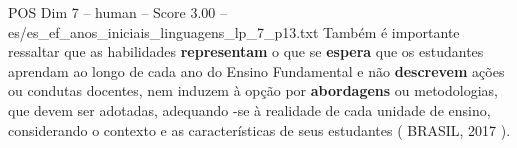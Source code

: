 \begin{textsample}{POS Dim 7 – human – Score 3.00 – es/es\_ef\_anos\_iniciais\_linguagens\_lp\_7\_p13.txt}  \label{ex:f7_pos_016}
Também é importante ressaltar que as habilidades \textbf{representam} o que se \textbf{espera} que os estudantes aprendam ao longo de cada ano do Ensino Fundamental e não \textbf{descrevem} ações ou condutas docentes, nem induzem à opção por \textbf{abordagens} ou metodologias, que devem ser adotadas, adequando -se à realidade de cada unidade de ensino, considerando o contexto e as características de seus estudantes ( BRASIL, 2017 ).

\end{textsample}
